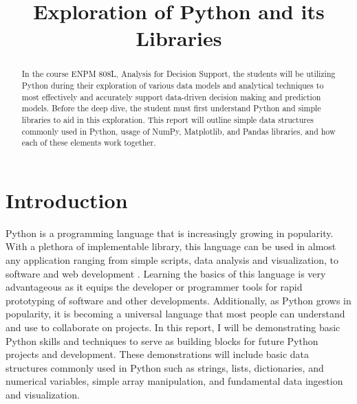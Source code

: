 \documentclass[journal]{IEEEtran}
\begin{document}
\setlength{\emergencystretch}{10pt}



\lstset{style=mystyle}

\title{Exploration of Python and its Libraries}

\author{
}

\maketitle

\begin{abstract}
\label{log:abstract}
In the course ENPM 808L, Analysis for Decision Support, the students will be utilizing Python during their exploration of various data models and analytical techniques to most effectively and accurately support data-driven decision making and prediction models. Before the deep dive, the student must first understand Python and simple libraries to aid in this exploration. This report will outline simple data structures commonly used in Python, usage of NumPy, Matplotlib, and Pandas libraries, and how each of these elements work together.
\end{abstract}

\section{Introduction}
Python is a programming language that is increasingly growing in popularity. With a plethora of implementable library, this language can be used in almost any application ranging from simple scripts, data analysis and visualization, to software and web development \cite{b1}. Learning the basics of this language is very advantageous as it equips the developer or programmer tools for rapid prototyping of software and other developments. Additionally, as Python grows in popularity, it is becoming a universal language that most people can understand and use to collaborate on projects. In this report, I will be demonstrating basic Python skills and techniques to serve as building blocks for future Python projects and development. These demonstrations will include basic data structures commonly used in Python such as strings, lists, dictionaries, and numerical variables, simple array manipulation, and fundamental data ingestion and visualization. 
\end{document}

